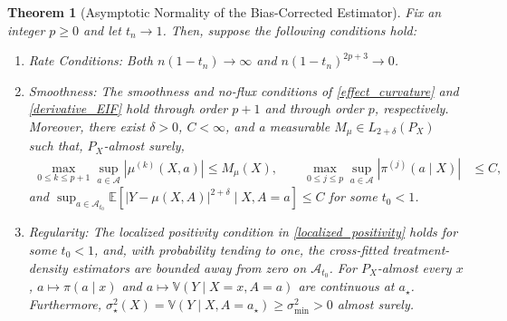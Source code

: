\documentclass[11pt,twoside]{article}
\newtheorem{theorem}{Theorem}
\theoremstyle{definition}
\theoremstyle{remark}
\begin{document}
\begin{theorem}[Asymptotic Normality of the Bias-Corrected Estimator] \label{higher_order_normality}
    Fix an integer $p\geq0$ and let $t_n \to 1$. Then, suppose the following conditions hold:
\begin{enumerate}
    \item[$(i)$] \textit{Rate Conditions:} Both $n(1 - t_n) \to \infty$ and $n (1 - t_n)^{2p+3} \to 0$.
    \item[$(ii)$] \textit{Smoothness:} The smoothness and no-flux conditions of \cref{effect_curvature} and \cref{derivative_EIF} hold through order $p+1$ and through order $p$, respectively. Moreover, there exist $\delta>0$, $C<\infty$, and a measurable $M_\mu\in L_{2+\delta}(P_X)$ such that, $P_X$-almost surely,
    \begin{align*}
        \max_{0\leq k\leq p+1}\sup_{a\in\mathcal A}
        |\mu^{(k)}(X,a)| \leq M_\mu(X), \qquad 
        \max_{0\leq j\leq p}\sup_{a\in\mathcal A}
        |\pi^{(j)}(a\mid X)| &\leq C,
    \end{align*}
    and $\sup_{a\in\mathcal A_{t_0}}
        \mathbb{E}\!\left[
            |Y-\mu(X,A)|^{2+\delta}\mid X,A=a
        \right] \leq C$ for some $t_0 < 1$.

    \item[$(iii)$] \textit{Regularity:} The localized positivity condition in \cref{localized_positivity} holds for some $t_0<1$, and, with probability tending to one, the cross-fitted treatment-density estimators are bounded away from zero on $\mathcal{A}_{t_0}$. For $P_X$-almost every $x$, $a\mapsto\pi(a\mid x)$ and $a\mapsto \mathbb{V}(Y\mid X=x,A=a)$ are continuous at $a_\star$. Furthermore, $\sigma_\star^2(X)=\mathbb{V}(Y\mid X,A=a_\star)\geq\sigma_{\min}^2>0$ almost surely.


\end{enumerate}
\end{theorem}
\end{document}
